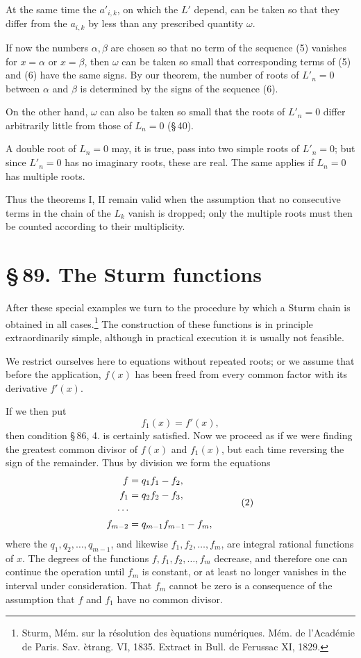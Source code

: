 \documentclass[11pt]{article}
\providecommand{\sect}[2]{\section*{\S\,#1. #2}}
\begin{document}
At the same time the $a'_{i,k}$, on which the $L'$ depend, can be taken so that they differ from the $a_{i,k}$ by less than any prescribed quantity $\omega$.

If now the numbers $\alpha,
\beta$ are chosen so that no term of the sequence (5) vanishes for $x=\alpha$ or $x=\beta$, then $\omega$ can be taken so small that corresponding terms of (5) and (6) have the same signs. By our theorem, the number of roots of $L'_n=0$ between $\alpha$ and $\beta$ is determined by the signs of the sequence (6).

On the other hand, $\omega$ can also be taken so small that the roots of $L'_n=0$ differ arbitrarily little from those of $L_n=0$ (\S\,40).

A double root of $L_n=0$ may, it is true, pass into two simple roots of $L'_n=0$; but since $L'_n=0$ has no imaginary roots, these are real. The same applies if $L_n=0$ has multiple roots.

Thus the theorems I, II remain valid when the assumption that no consecutive terms in the chain of the $L_k$ vanish is dropped; only the multiple roots must then be counted according to their multiplicity.

\sect{89}{The Sturm functions}

After these special examples we turn to the procedure by which a Sturm chain is obtained in all cases.\footnote{Sturm, M\'em. sur la r\'esolution des \`equations num\'eriques. M\'em. de l'Acad\'emie de Paris. Sav. \`etrang. VI, 1835. Extract in Bull. de Ferussac XI, 1829.} The construction of these functions is in principle extraordinarily simple, although in practical execution it is usually not feasible.

We restrict ourselves here to equations without repeated roots; or we assume that before the application, $f(x)$ has been freed from every common factor with its derivative $f'(x)$.

If we then put
\begin{equation}
        f_1(x)=f'(x),
\tag{1}
\end{equation}
then condition \S\,86, 4. is certainly satisfied. Now we proceed as if we were finding the greatest common divisor of $f(x)$ and $f_1(x)$, but each time reversing the sign of the remainder. Thus by division we form the equations
\begin{equation}
\begin{aligned}
        f&=q_1f_1-f_2,
        \cr
        f_1&=q_2f_2-f_3,
        \cr
        \cdots&
        \cr
        f_{m-2}&=q_{m-1}f_{m-1}-f_m,
\end{aligned}
\tag{2}
\end{equation}
where the $q_1,q_2,
\ldots,q_{m-1}$, and likewise $f_1,f_2,
\ldots,f_m$, are integral rational functions of $x$. The degrees of the functions $f,f_1,f_2,
\ldots,f_m$ decrease, and therefore one can continue the operation until $f_m$ is constant, or at least no longer vanishes in the interval under consideration. That $f_m$ cannot be zero is a consequence of the assumption that $f$ and $f_1$ have no common divisor.
\end{document}
